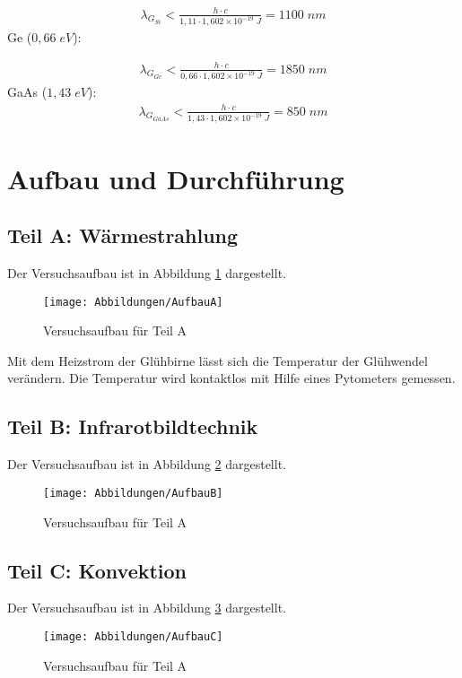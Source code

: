 \documentclass[a4paper]{scrartcl}
\numberwithin{equation}{subsection}
\begin{document}
\begin{align*}
\lambda_{G_{Si}} < \frac{h \cdot c}{1,11\cdot 1,602\times 10^{-19}\;J} = 1100\;nm 
\end{align*}
Ge ($0,66\;eV$):

\begin{align*}
\lambda_{G_{Ge}} < \frac{h \cdot c}{0,66\cdot 1,602\times 10^{-19}\;J} = 1850\;nm 
\end{align*}
GaAs ($1,43\;eV$):
\begin{align*}
\lambda_{G_{GaAs}} < \frac{h \cdot c}{1,43\cdot 1,602\times 10^{-19}\;J} = 850\;nm 
\end{align*}

\newpage
\section{Aufbau und Durchführung}
\subsection{Teil A: Wärmestrahlung}
Der Versuchsaufbau ist in Abbildung \ref{fig:AufbauA} dargestellt.

\begin{figure}[H]
\texttt{[image: Abbildungen/AufbauA]}
\centering
\caption{Versuchsaufbau für Teil A \cite{anl}}
\centering
\label{fig:AufbauA}
\end{figure}

Mit dem Heizstrom der Glühbirne lässt sich die Temperatur der Glühwendel verändern.
Die Temperatur wird kontaktlos mit Hilfe eines Pytometers gemessen.

\subsection{Teil B: Infrarotbildtechnik}
Der Versuchsaufbau ist in Abbildung \ref{fig:AufbauB} dargestellt.

\begin{figure}[H]
\texttt{[image: Abbildungen/AufbauB]}
\centering
\caption{Versuchsaufbau für Teil A \cite{anl}}
\centering
\label{fig:AufbauB}
\end{figure}
\subsection{Teil C: Konvektion}
Der Versuchsaufbau ist in Abbildung \ref{fig:AufbauC} dargestellt.

\begin{figure}[H]
\texttt{[image: Abbildungen/AufbauC]}
\centering
\caption{Versuchsaufbau für Teil A \cite{anl}}
\centering
\label{fig:AufbauC}
\end{figure}
\end{document}
